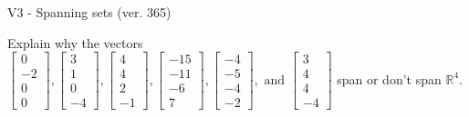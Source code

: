 \begin{exercise}
  \begin{exerciseTitle}V3 - Spanning sets (ver. 365)\end{exerciseTitle}
  \begin{exerciseStatement}
    Explain why the vectors \(\left[\begin{array}{r}
0 \\
-2 \\
0 \\
0
\end{array}\right] , \left[\begin{array}{r}
3 \\
1 \\
0 \\
-4
\end{array}\right] , \left[\begin{array}{r}
4 \\
4 \\
2 \\
-1
\end{array}\right] , \left[\begin{array}{r}
-15 \\
-11 \\
-6 \\
7
\end{array}\right] , \left[\begin{array}{r}
-4 \\
-5 \\
-4 \\
-2
\end{array}\right] , \text{ and } \left[\begin{array}{r}
3 \\
4 \\
4 \\
-4
\end{array}\right]\) span or don't span \(\mathbb{R}^4\). 
	



\end{exerciseStatement}
\end{exercise}
